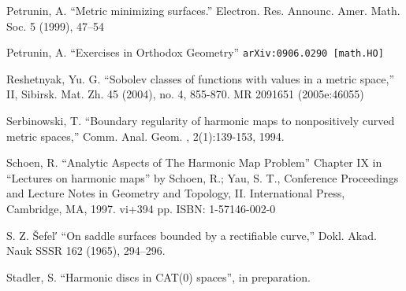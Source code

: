 \documentclass[a4paper,10pt]{amsart}
\begin{document}
\begin{thebibliography}{52}
 Petrunin, A.
``Metric minimizing surfaces.''
Electron. Res. Announc. Amer. Math. Soc. 5 (1999), 47--54 

 Petrunin, A. 
``Exercises in Orthodox Geometry''
{\tt arXiv:0906.0290 [math.HO]}

Reshetnyak, Yu. G. ``Sobolev classes of functions with values in a metric space,'' II, Sibirsk. Mat. Zh. 45 (2004), no. 4, 855-870. MR 2091651 (2005e:46055)

 Serbinowski,  T. ``Boundary regularity of harmonic maps to nonpositively curved metric spaces,''
Comm. Anal. Geom. , 2(1):139-153, 1994.

Schoen, R. ``Analytic Aspects of The Harmonic Map Problem'' Chapter IX in  
``Lectures on harmonic maps'' by Schoen, R.; Yau, S. T.,  
Conference Proceedings and Lecture Notes in Geometry and Topology, II. International Press, Cambridge, MA, 1997. vi+394 pp. ISBN: 1-57146-002-0

 S. Z. \v{S}efel′ ``On saddle surfaces bounded by a rectifiable curve,'' Dokl. Akad. Nauk SSSR 162 (1965), 294--296.


 Stadler, S. ``Harmonic discs in CAT(0) spaces'', in preparation.



\end{thebibliography}
\end{document}
